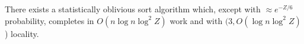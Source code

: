 \begin{corollary}
There exists a statistically oblivious sort algorithm which, except with $\approx e^{-Z/6}$ probability, completes in $O(n \log n \log^2 Z)$ work and with $(3, O(\log n \log^2 Z)$) locality.
\end{corollary}
%



